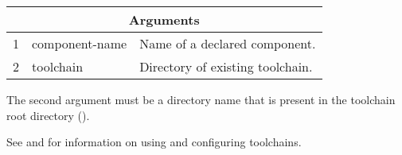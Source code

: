 \begin{tabularx}{\linewidth}{ll|X}
  \multicolumn{3}{c}{\textbf{Arguments}} \\ \hline

  1 & component-name & Name of a declared component. \\
  2 & toolchain & Directory of existing toolchain.
\end{tabularx}

The second argument must be a directory name that is present in the
toolchain root directory ().

See  and
 for information on using and
configuring toolchains.
